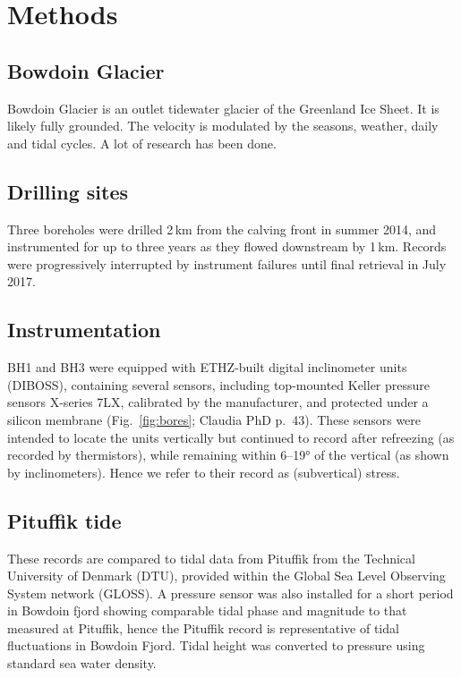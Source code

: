 \documentclass[utf8]{article}
\begin{document}
\section{Methods}

\subsection{Bowdoin Glacier}

    Bowdoin Glacier is an outlet tidewater glacier of the Greenland Ice Sheet.
    It is likely fully grounded. The velocity is modulated by the seasons,
    weather, daily and tidal cycles. A lot of research has been done.

\subsection{Drilling sites}

    Three boreholes were drilled 2\,km from the calving front in summer 2014,
    and instrumented for up to three years as they flowed downstream by 1\,km.
    Records were progressively interrupted by instrument failures until final
    retrieval in July 2017.

\subsection{Instrumentation}

    BH1 and BH3 were equipped with ETHZ-built digital inclinometer units
    (DIBOSS), containing several sensors, including top-mounted Keller pressure
    sensors X-series 7LX, calibrated by the manufacturer, and protected under a
    silicon membrane (Fig.~\ref{fig:bores}; Claudia PhD p.~43). These sensors
    were intended to locate the units vertically but continued to record after
    refreezing (as recorded by thermistors), while remaining within 6--19° of
    the vertical (as shown by inclinometers). Hence we refer to their record as
    (subvertical) stress.

\subsection{Pituffik tide}

    These records are compared to tidal data from Pituffik from the Technical
    University of Denmark (DTU), provided within the Global Sea Level Observing
    System network (GLOSS). A pressure sensor was also installed for a short
    period in Bowdoin fjord showing comparable tidal phase and magnitude to
    that measured at Pituffik, hence the Pituffik record is representative of
    tidal fluctuations in Bowdoin Fjord. Tidal height was converted to pressure
    using standard sea water density.
\end{document}
